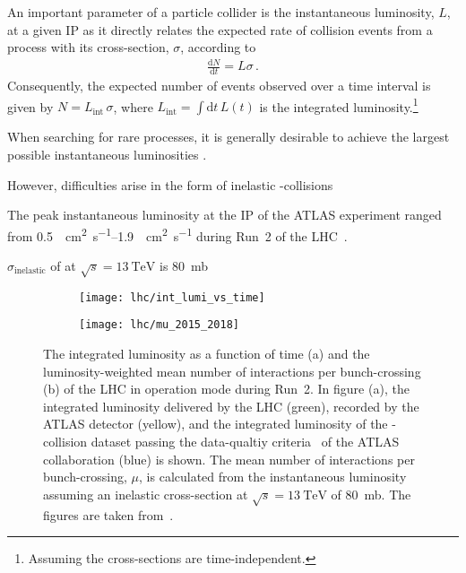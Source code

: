 An important parameter of a particle collider is the instantaneous luminosity,
$L$, at a given IP as it directly relates the expected rate of collision events
from a process with its cross-section, $\sigma$, according to
\begin{align*}
  \frac{\mathrm{d}N}{\mathrm{d}t} = L \sigma \,\text{.}
\end{align*}
Consequently, the expected number of events observed over a time interval is
given by $N = L_{\text{int}} \, \sigma$, where
$L_{\text{int}} = \int \mathrm{d}t \, L(t)$ is the integrated
luminosity.\footnote{Assuming the cross-sections are time-independent.}



When searching for rare processes, it is generally desirable to achieve the
largest possible instantaneous luminosities .

However, difficulties arise in the form of inelastic \pp-collisions


The peak instantaneous luminosity at the IP of the ATLAS experiment ranged from
\SIrange{0.5}{1.9}{\per\centi\metre\squared\per\second} during Run~2 of the
LHC~\cite{ATLAS-CONF-2019-021}.


$\sigma_{\text{inelastic}}$ of \pp at $\sqrt{s} = \SI{13}{\TeV}$ is
\SI{80}{\milli\barn}~\cite{STDM-2015-05}





\begin{figure}[htbp]
  \centering

  \begin{subfigure}{0.47\textwidth}
    \texttt{[image: lhc/int\_lumi\_vs\_time]}
    \subcaption{}%
    \label{fig:atlas_int_lumi_vs_time}
  \end{subfigure}\hspace*{0.02\textwidth}%
  \begin{subfigure}{0.47\textwidth}
    \texttt{[image: lhc/mu\_2015\_2018]}
    \subcaption{}%
    \label{fig:atlas_mu}
  \end{subfigure}

  \caption{The integrated luminosity as a function of time (a) and the
    luminosity-weighted mean number of interactions per bunch-crossing (b) of
    the LHC in \pp operation mode during Run~2. In figure (a), the integrated
    luminosity delivered by the LHC (green), recorded by the ATLAS detector
    (yellow), and the integrated luminosity of the \pp-collision dataset passing
    the data-qualtiy criteria~\cite{DAPR-2018-01} of the ATLAS collaboration
    (blue) is shown. The mean number of interactions per bunch-crossing, $\mu$,
    is calculated from the instantaneous luminosity assuming an inelastic \pp
    cross-section at $\sqrt{s} = \SI{13}{\TeV}$ of \SI{80}{\milli\barn}. The
    figures are taken from~\cite{atlas_luminosity_summary_plots}.}%
  \label{fig:lumi_and_pu}
\end{figure}

